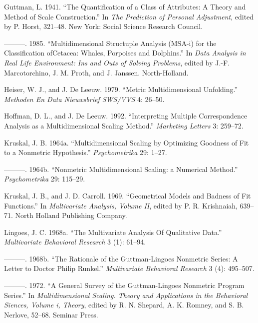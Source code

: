 \documentclass[
  12pt,
]{article}
\newlength{\cslhangindent}
\newenvironment{CSLReferences}[2] %
 {\begin{list}{}{%
  \setlength{\itemindent}{0pt}
  \setlength{\leftmargin}{0pt}
  \setlength{\parsep}{0pt}
  \ifodd #1
   \setlength{\leftmargin}{\cslhangindent}
   \setlength{\itemindent}{-1\cslhangindent}
  \fi
  \setlength{\itemsep}{#2\baselineskip}}}
 {\end{list}}
\begin{document}
\begin{CSLReferences}{1}{0}
Guttman, L. 1941. {``{The Quantification of a Class of Attributes: A Theory and Method of Scale Construction}.''} In \emph{The Prediction of Personal Adjustment}, edited by P. Horst, 321--48. New York: Social Science Research Council.

---------. 1985. {``Multidimensional Structuple Analysis (MSA-i) for the Classification ofCetacea: Whales, Porpoises and Dolphins.''} In \emph{Data Analysis in Real Life Environment: Ins and Outs of Solving Problems}, edited by J.-F. Marcotorchino, J. M. Proth, and J. Janssen. North-Holland.

Heiser, W. J., and J. De Leeuw. 1979. {``Metric Multidimensional Unfolding.''} \emph{Methoden En Data Nieuwsbrief SWS/VVS} 4: 26--50.

Hoffman, D. L., and J. De Leeuw. 1992. {``Interpreting Multiple Correspondence Analysis as a Multidimensional Scaling Method.''} \emph{Marketing Letters} 3: 259--72.

Kruskal, J. B. 1964a. {``{Multidimensional Scaling by Optimizing Goodness of Fit to a Nonmetric Hypothesis}.''} \emph{Psychometrika} 29: 1--27.

---------. 1964b. {``{Nonmetric Multidimensional Scaling: a Numerical Method}.''} \emph{Psychometrika} 29: 115--29.

Kruskal, J. B., and J. D. Carroll. 1969. {``{Geometrical Models and Badness of Fit Functions}.''} In \emph{Multivariate Analysis, Volume II}, edited by P. R. Krishnaiah, 639--71. North Holland Publishing Company.

Lingoes, J. C. 1968a. {``{The Multivariate Analysis Of Qualitative Data}.''} \emph{Multivariate Behavioral Research} 3 (1): 61--94.

---------. 1968b. {``{The Rationale of the Guttman-Lingoes Nonmetric Series: A Letter to Doctor Philip Runkel}.''} \emph{Multivariate Behavioral Research} 3 (4): 495--507.

---------. 1972. {``A General Survey of the Guttman-Lingoes Nonmetric Program Series.''} In \emph{Multidimensional Scaling. Theory and Applications in the Behavioral Siences, Volume i, Theory}, edited by R. N. Shepard, A. K. Romney, and S. B. Nerlove, 52--68. Seminar Press.


\end{CSLReferences}
\end{document}
